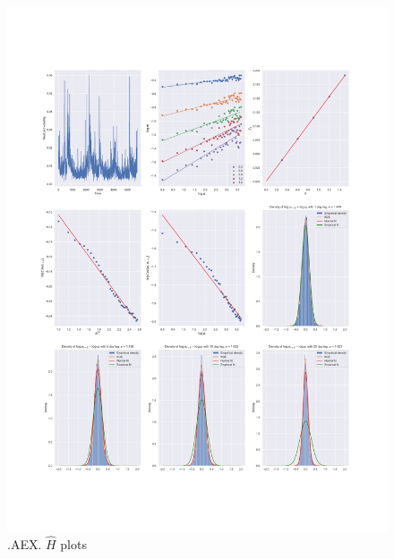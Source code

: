 	\begin{figure}[h]
		\centering
		\includegraphics[width=\linewidth]{fig/.AEX.pdf}
		\caption{.AEX. $\hat{H}$ plots}
	\end{figure}

